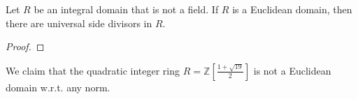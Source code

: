   \begin{theorem}
    Let $R$ be an integral domain that is not a field. If $R$ is a Euclidean domain, then there are universal side divisors in $R$. 
  \end{theorem}
  \begin{proof}
    
  \end{proof}

  \begin{example}[]
    We claim that the quadratic integer ring $R = \mathbb{Z}[\frac{1 + \sqrt{19}}{2}]$ is not a Euclidean domain w.r.t. any norm. 
  \end{example}
